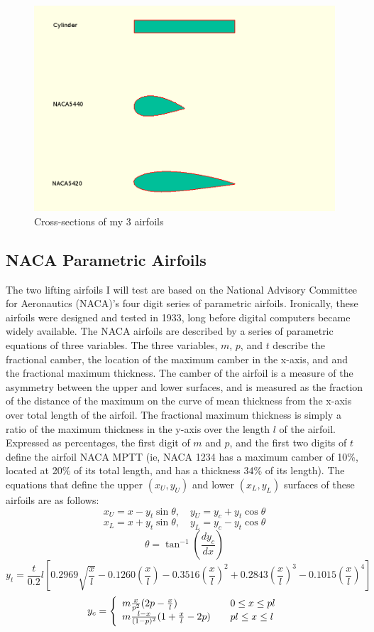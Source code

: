 \documentclass[12pt]{article}
\begin{document}
\begin{figure}[H]
\centering
\includegraphics[width=6in]{../images/airfoils.png}
\caption{Cross-sections of my 3 airfoils}
\end{figure}

\subsection{NACA Parametric Airfoils}
The two lifting airfoils I will test are based on the National Advisory
Committee for Aeronautics (NACA)'s four digit series of parametric airfoils.
Ironically, these airfoils were designed and tested in 1933, long before 
digital computers became widely available.  The NACA airfoils are described
by a series of parametric equations of three variables.  The three variables,
$m$, $p$, and $t$ describe the fractional camber, the location of the
maximum camber in the x-axis, and and the fractional maximum thickness.  The
camber of the airfoil is a measure of the asymmetry between the upper and lower
surfaces, and is measured as the fraction of the distance of the maximum on the
curve of mean thickness from the x-axis over total length of the airfoil.  The
fractional maximum thickness is simply a ratio of the maximum thickness in the
y-axis over the length $l$ of the airfoil.  Expressed as percentages, the first
digit of $m$ and $p$, and the first two digits of $t$ define the airfoil 
NACA MPTT (ie, NACA 1234 has a maximum camber of 10\%, located at 20\% of its
total length, and has a thickness 34\% of its length).  The equations that
define the upper $(x_U, y_U)$  and lower $(x_L, y_L)$ surfaces of these 
airfoils are as follows:
$$x_U = x - y_t\sin\theta, \quad y_U = y_c+y_t\cos\theta$$
$$x_L = x + y_t\sin\theta, \quad y_L = y_c-y_t\cos\theta$$
$$\theta = \tan^{-1}(\frac{dy_c}{dx})$$
$$y_t = \frac{t}{0.2}l[0.2969\sqrt{\frac{x}{l}}-0.1260(\frac{x}{l})-
0.3516(\frac{x}{l})^2+0.2843(\frac{x}{l})^3-0.1015(\frac{x}{l})^4]$$
\[y_c = \left\{\begin{array}{l l}
    m\frac{x}{p^2}(2p-\frac{x}{l}) & \quad 0 \le x \le pl \\
    m\frac{l-x}{(1-p)^2}(1+\frac{x}{l}-2p) & \quad pl \le x \le l\\
  \end{array} \right.
\]
\end{document}

